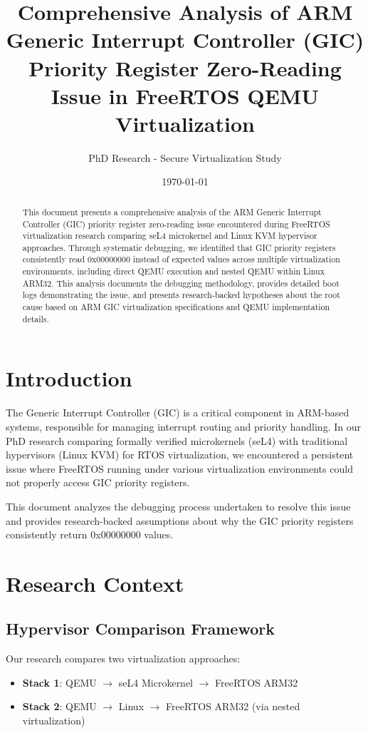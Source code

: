 \documentclass[12pt,a4paper]{article}
\title{Comprehensive Analysis of ARM Generic Interrupt Controller (GIC) Priority Register Zero-Reading Issue in FreeRTOS QEMU Virtualization}
\author{PhD Research - Secure Virtualization Study}
\date{\today}
\begin{document}
\maketitle

\begin{abstract}
This document presents a comprehensive analysis of the ARM Generic Interrupt Controller (GIC) priority register zero-reading issue encountered during FreeRTOS virtualization research comparing seL4 microkernel and Linux KVM hypervisor approaches. Through systematic debugging, we identified that GIC priority registers consistently read 0x00000000 instead of expected values across multiple virtualization environments, including direct QEMU execution and nested QEMU within Linux ARM32. This analysis documents the debugging methodology, provides detailed boot logs demonstrating the issue, and presents research-backed hypotheses about the root cause based on ARM GIC virtualization specifications and QEMU implementation details.
\end{abstract}

\section{Introduction}

The Generic Interrupt Controller (GIC) is a critical component in ARM-based systems, responsible for managing interrupt routing and priority handling. In our PhD research comparing formally verified microkernels (seL4) with traditional hypervisors (Linux KVM) for RTOS virtualization, we encountered a persistent issue where FreeRTOS running under various virtualization environments could not properly access GIC priority registers.

This document analyzes the debugging process undertaken to resolve this issue and provides research-backed assumptions about why the GIC priority registers consistently return 0x00000000 values.

\section{Research Context}

\subsection{Hypervisor Comparison Framework}

Our research compares two virtualization approaches:
\begin{itemize}
    \item \textbf{Stack 1}: QEMU $\rightarrow$ seL4 Microkernel $\rightarrow$ FreeRTOS ARM32
    \item \textbf{Stack 2}: QEMU $\rightarrow$ Linux $\rightarrow$ FreeRTOS ARM32 (via nested virtualization)
\end{itemize}
\end{document}
